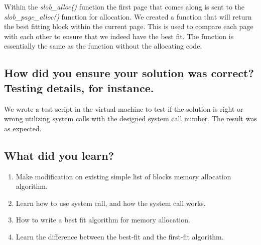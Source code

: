 \documentclass[a4paper]{article}
\begin{document}
Within the \textit{slob\_alloc()} function the first page that comes along is sent to the \textit{slob\_page\_alloc()} function for allocation. We created a function that will return the best fitting block within the current page. This is used to compare each page with each other to ensure that we indeed have the best fit. The function is essentially the same as the function without the allocating code.
   
\subsection{How did you ensure your solution was correct? Testing details, for instance.
}
We wrote a test script in the virtual machine to test if the solution is right or wrong utilizing system calls with the designed system call number. The result was as expected.


\subsection{What did you learn?}
\begin{enumerate}
\item Make modification on existing simple list of blocks memory allocation algorithm.
\item Learn how to use system call, and how the system call works.
\item How to write a best fit algorithm for memory allocation.
\item Learn the difference between the best-fit and the first-fit algorithm.
\end{enumerate}
\end{document}
